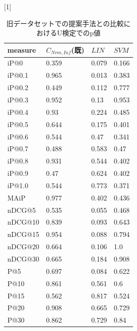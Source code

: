\begin{table}[h]
  \caption{旧データセットでの提案手法との比較におけるU検定でのp値} 
  \label{tbl:resultOldUP}
  \begin{center} {
\scalebox{0.9}[1]{
\begin{tabular}{|l|l|ll|} \hline
measure&$C_{Nrm,Inf}$(既)&$LIN$&$SVM$\\ \hline
iP@0&0.359&0.079&0.166\\
iP@0.1&0.965&0.013&0.383\\
iP@0.2&0.449&0.112&0.777\\
iP@0.3&0.952&0.13&0.953\\
iP@0.4&0.93&0.224&0.485\\
iP@0.5&0.644&0.175&0.401\\
iP@0.6&0.544&0.47&0.341\\
iP@0.7&0.488&0.583&0.47\\
iP@0.8&0.931&0.544&0.402\\
iP@0.9&0.47&0.624&0.402\\
iP@1.0&0.544&0.773&0.371\\ \hline
MAiP&0.977&0.402&0.436\\ \hline
nDCG@5&0.535&0.055&0.468\\
nDCG@10&0.839&0.093&0.643\\
nDCG@15&0.954&0.088&0.794\\
nDCG@20&0.664&0.106&1.0\\
nDCG@30&0.665&0.184&0.908\\ \hline
P@5&0.697&0.084&0.622\\
P@10&0.861&0.561&0.6\\
P@15&0.562&0.817&0.524\\
P@20&0.908&0.665&0.729\\
P@30&0.862&0.729&0.84\\ \hline
\end{tabular}
  }
    }
  \end{center}
\end{table}


